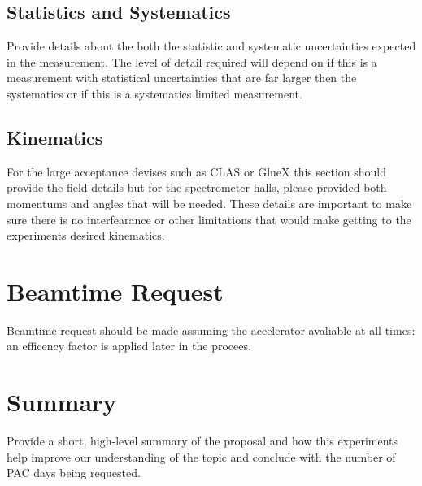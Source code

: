 \documentclass[titlepage,10pt]{article}
\begin{document}
\subsection{Statistics and Systematics}

Provide details about the both the statistic and systematic uncertainties expected in the measurement.    The level of detail required will depend on if this is a measurement with statistical uncertainties that are far larger then the systematics or if this is a systematics limited measurement.

\subsection{Kinematics}

For the large acceptance devises such as CLAS or GlueX this section should provide the field details but for the spectrometer halls, please provided both momentums and angles that will be needed.   These details are important to make sure there is no interfearance or other limitations that would make getting to the experiments desired kinematics.    

\section{Beamtime Request} 

Beamtime request should be made assuming the accelerator avaliable at all times: an efficency factor is applied later in the procees.    


\section{Summary}

Provide a short, high-level summary of the proposal and how this experiments help improve our understanding of the topic and conclude with the number of PAC days being requested.

%
%
%


%
%
%
%
\newpage


\end{document}
